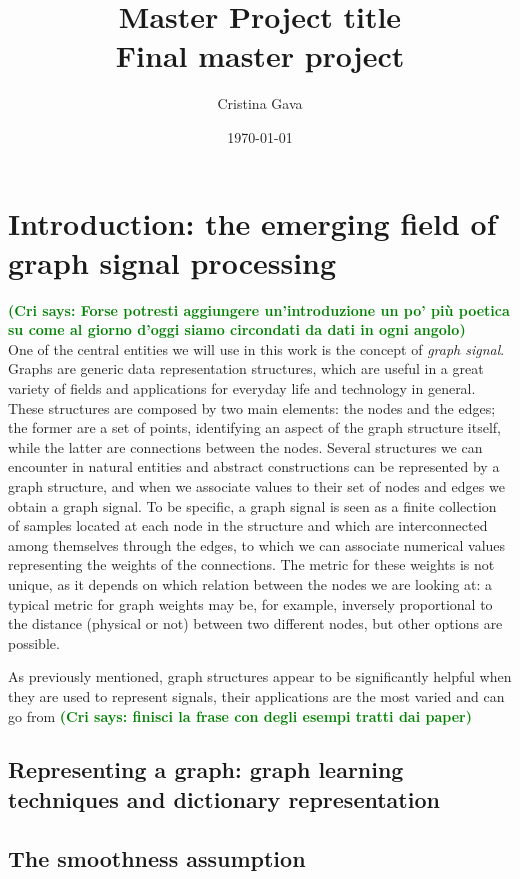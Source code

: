 \documentclass[11pt,a4paper,titlepage]{article}
\title{\blue Master Project title \\
\blueb Final master project}
\author{Cristina Gava}
\date{\today}
\newcommand{\cri}[1]{\textcolor{green}{\textbf{(Cri says: #1)}}}
\begin{document}
\maketitle

\tableofcontents

\section{Introduction: the emerging field of graph signal processing}
\cri{Forse potresti aggiungere un'introduzione un po' più poetica su come al giorno d'oggi siamo circondati da dati in ogni angolo}\\
One of the central entities we will use in this work is the concept of \textit{graph signal}. Graphs are generic data representation structures, which are useful in a great variety of fields and applications for everyday life and technology in general. These structures are composed by two main elements: the nodes and the edges; the former are a set of points, identifying an aspect of the graph structure itself, while the latter are connections between the nodes. Several structures we can encounter in natural entities and abstract constructions can be represented by a graph structure, and when we associate values to their set of nodes and edges we obtain a graph signal. To be specific, a graph signal is seen as a finite collection of samples located at each node in the structure and which are interconnected among themselves through the edges, to which we can associate numerical values representing the weights of the connections. The metric for these weights is not unique, as it depends on which relation between the nodes we are looking at: a typical metric for graph weights may be, for example, inversely proportional to the distance (physical or not) between two different nodes, but other options are possible.

As previously mentioned, graph structures appear to be significantly helpful when they are used to represent signals, their applications are the most varied and can go from \cri{finisci la frase con degli esempi tratti dai paper}

\subsection{Representing a graph: graph learning techniques and dictionary representation}
\lipsum[1-15]

\subsection{The smoothness assumption}
\lipsum[1-15]
\end{document}
